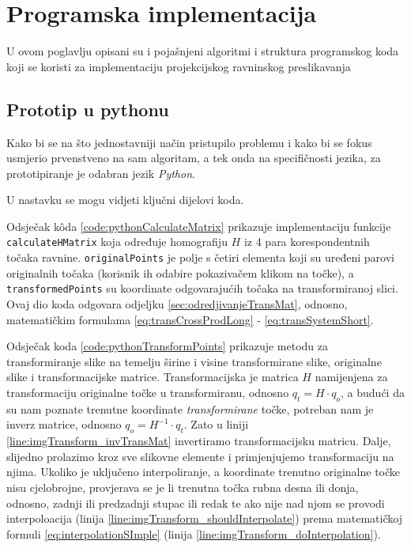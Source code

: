 \chapter{Programska implementacija}
\label{ch:implementacija}

U ovom poglavlju opisani su i pojašnjeni algoritmi i struktura programskog koda koji se koristi za implementaciju projekcijskog ravninskog preslikavanja

\section{Prototip u pythonu}
\label{sec:pythonProto}
\lstset{
	language=Python, 
	tabsize=2,
	numbers=left,
	breaklines=true,
	basicstyle=\ttfamily,
	columns=fixed
}

Kako bi se na što jednostavniji način pristupilo problemu i kako bi se fokus usmjerio prvenstveno na sam algoritam, a tek onda na specifičnosti jezika, za prototipiranje je odabran jezik \textit{Python}.

U nastavku se mogu vidjeti ključni dijelovi koda.



Odsječak kôda \ref{code:pythonCalculateMatrix} prikazuje implementaciju funkcije \lstinline!calculateHMatrix! koja određuje homografiju $H$ iz 4 para korespondentnih točaka ravnine. \lstinline!originalPoints! je polje s četiri elementa koji su uređeni parovi originalnih točaka (korisnik ih odabire pokazivačem klikom na točke), a \lstinline!transformedPoints! su koordinate odgovarajućih točaka na transformiranoj slici. Ovaj dio koda odgovara odjeljku \ref{sec:odredjivanjeTransMat}, odnosno, matematičkim formulama \eqref{eq:transCrossProdLong} - \eqref{eq:transSystemShort}.



Odsječak koda \ref{code:pythonTransformPoints} prikazuje metodu za transformiranje slike na temelju širine i visine transformirane slike, originalne slike i transformacijske matrice. Transformacijska je matrica $H$ namijenjena za transformaciju originalne točke u transformiranu, odnosno $q_t = H \cdot q_o$, a budući da su nam poznate trenutne koordinate \emph{transformirane} točke, potreban nam je inverz matrice, odnosno $q_o = H^{-1} \cdot q_t$. Zato u liniji \ref{line:imgTransform_invTransMat} invertiramo transformacijsku matricu. Dalje, slijedno prolazimo kroz sve slikovne elemente i primjenjujemo transformaciju na njima. Ukoliko je uključeno interpoliranje, a koordinate trenutno originalne točke nisu cjelobrojne, provjerava se je li trenutna točka rubna desna ili donja, odnosno, zadnji ili predzadnji stupac ili redak te ako nije nad njom se provodi interpoloacija (linija \ref{line:imgTransform_shouldInterpolate}) prema matematičkoj formuli \eqref{eq:interpolationSImple} (linija \ref{line:imgTransform_doInterpolation}).


